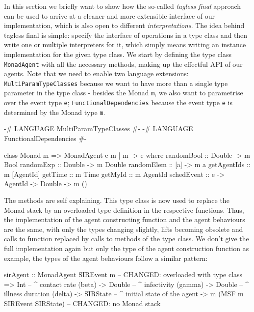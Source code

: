 \medskip

In this section we briefly want to show how the so-called \textit{tagless final} approach \cite{kiselyov_typed_2012} can be used to arrive at a cleaner and more extensible interface of our implementation, which is also open to different \textit{interpretations}. The idea behind tagless final is simple: specify the interface of operations in a type class and then write one or multiple interpreters for it, which simply means writing an instance implementation for the given type class. We start by defining the type class \texttt{MonadAgent} with all the necessary methods, making up the effectful API of our agents. Note that we need to enable two language extensions: \texttt{MultiParamTypeClasses} because we want to have more than a single type parameter in the type class - besides the Monad \texttt{m}, we also want to parametrise over the event type \texttt{e}; \texttt{FunctionalDependencies} because the event type \texttt{e} is determined by the Monad type \texttt{m}.

\begin{HaskellCode}
{-# LANGUAGE MultiParamTypeClasses  #-}
{-# LANGUAGE FunctionalDependencies #-}

class Monad m => MonadAgent e m | m -> e where
  randomBool  :: Double -> m Bool
  randomExp   :: Double -> m Double
  randomElem  :: [a] -> m a
  getAgentIds :: m [AgentId]
  getTime     :: m Time
  getMyId     :: m AgentId
  schedEvent  :: e -> AgentId -> Double -> m ()
\end{HaskellCode}

The methods are self explaining. This type class is now used to replace the Monad stack by an overloaded type definition in the respective functions. Thus, the implementation of the agent constructing function and the agent behaviours are the same, with only the types changing slightly, lifts becoming obsolete and calls to function replaced by calls to methods of the type class. We don't give the full implementation again but only the type of the agent construction function as example, the types of the agent behaviours follow a similar pattern: 

\begin{HaskellCode}
sirAgent :: MonadAgent SIREvent m  -- CHANGED: overloaded with type class
         => Int         -- ^ contact rate (beta)
         -> Double      -- ^ infectivity (gamma)
         -> Double      -- ^ illness duration (delta)
         -> SIRState    -- ^ initial state of the agent
         -> m (MSF m SIREvent SIRState) -- CHANGED: no Monad stack
\end{HaskellCode}

